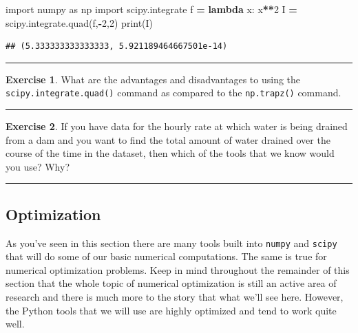 \documentclass[
]{book}
\newenvironment{Shaded}{\begin{snugshade}}{\end{snugshade}}
\newcommand{\BuiltInTok}[1]{#1}
\newcommand{\DecValTok}[1]{\textcolor[rgb]{0.00,0.00,0.81}{#1}}
\newcommand{\ImportTok}[1]{#1}
\newcommand{\KeywordTok}[1]{\textcolor[rgb]{0.13,0.29,0.53}{\textbf{#1}}}
\newcommand{\NormalTok}[1]{#1}
\newcommand{\OperatorTok}[1]{\textcolor[rgb]{0.81,0.36,0.00}{\textbf{#1}}}
\theoremstyle{definition}
\theoremstyle{definition}
\theoremstyle{definition}
\newtheorem{exercise}{Exercise}[chapter]
\theoremstyle{remark}
\begin{document}
\begin{Shaded}
\begin{Highlighting}[]
\ImportTok{import}\NormalTok{ numpy }\ImportTok{as}\NormalTok{ np}
\ImportTok{import}\NormalTok{ scipy.integrate}
\NormalTok{f }\OperatorTok{=} \KeywordTok{lambda}\NormalTok{ x: x}\OperatorTok{**}\DecValTok{2}
\NormalTok{I }\OperatorTok{=}\NormalTok{ scipy.integrate.quad(f,}\OperatorTok{{-}}\DecValTok{2}\NormalTok{,}\DecValTok{2}\NormalTok{)}
\BuiltInTok{print}\NormalTok{(I)}
\end{Highlighting}
\end{Shaded}

\begin{verbatim}
## (5.333333333333333, 5.921189464667501e-14)
\end{verbatim}

\begin{center}\rule{0.5\linewidth}{0.5pt}\end{center}

\begin{exercise}
\protect\hypertarget{exr:unnamed-chunk-231}{}{\label{exr:unnamed-chunk-231} }What are the advantages and disadvantages to using the \texttt{scipy.integrate.quad()} command as compared to the \texttt{np.trapz()} command.
\end{exercise}

\begin{center}\rule{0.5\linewidth}{0.5pt}\end{center}

\begin{exercise}
\protect\hypertarget{exr:unnamed-chunk-232}{}{\label{exr:unnamed-chunk-232} }If you have data for the hourly rate at which water is being drained from a dam and you want to find the total amount of water drained over the course of the time in the dataset, then which of the tools that we know would you use? Why?
\end{exercise}

\begin{center}\rule{0.5\linewidth}{0.5pt}\end{center}

\hypertarget{optimization-1}{%
\subsection{Optimization}\label{optimization-1}}

As you've seen in this section there are many tools built into \texttt{numpy} and \texttt{scipy} that will do some of our basic numerical computations. The same is true for numerical optimization problems. Keep in mind throughout the remainder of this section that the whole topic of numerical optimization is still an active area of research and there is much more to the story that what we'll see here. However, the Python tools that we will use are highly optimized and tend to work quite well.
\end{document}
